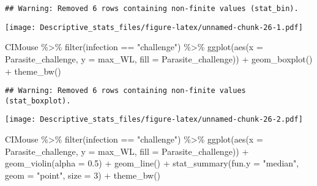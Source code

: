 \documentclass[
]{article}
\newenvironment{Shaded}{\begin{snugshade}}{\end{snugshade}}
\newcommand{\AttributeTok}[1]{\textcolor[rgb]{0.77,0.63,0.00}{#1}}
\newcommand{\DecValTok}[1]{\textcolor[rgb]{0.00,0.00,0.81}{#1}}
\newcommand{\FloatTok}[1]{\textcolor[rgb]{0.00,0.00,0.81}{#1}}
\newcommand{\FunctionTok}[1]{\textcolor[rgb]{0.00,0.00,0.00}{#1}}
\newcommand{\NormalTok}[1]{#1}
\newcommand{\SpecialCharTok}[1]{\textcolor[rgb]{0.00,0.00,0.00}{#1}}
\newcommand{\StringTok}[1]{\textcolor[rgb]{0.31,0.60,0.02}{#1}}
\begin{document}
\begin{verbatim}
## Warning: Removed 6 rows containing non-finite values (stat_bin).
\end{verbatim}

\texttt{[image: Descriptive\_stats\_files/figure-latex/unnamed-chunk-26-1.pdf]}

\begin{Shaded}
\begin{Highlighting}[]
\NormalTok{CIMouse  }\SpecialCharTok{\%\textgreater{}\%}
    \FunctionTok{filter}\NormalTok{(infection }\SpecialCharTok{==} \StringTok{"challenge"}\NormalTok{)  }\SpecialCharTok{\%\textgreater{}\%}
  \FunctionTok{ggplot}\NormalTok{(}\FunctionTok{aes}\NormalTok{(}\AttributeTok{x =}\NormalTok{ Parasite\_challenge, }\AttributeTok{y =}\NormalTok{ max\_WL, }\AttributeTok{fill =}\NormalTok{ Parasite\_challenge)) }\SpecialCharTok{+}
  \FunctionTok{geom\_boxplot}\NormalTok{() }\SpecialCharTok{+}
    \FunctionTok{theme\_bw}\NormalTok{()}
\end{Highlighting}
\end{Shaded}

\begin{verbatim}
## Warning: Removed 6 rows containing non-finite values (stat_boxplot).
\end{verbatim}

\texttt{[image: Descriptive\_stats\_files/figure-latex/unnamed-chunk-26-2.pdf]}

\begin{Shaded}
\begin{Highlighting}[]
\NormalTok{CIMouse  }\SpecialCharTok{\%\textgreater{}\%}
    \FunctionTok{filter}\NormalTok{(infection }\SpecialCharTok{==} \StringTok{"challenge"}\NormalTok{)  }\SpecialCharTok{\%\textgreater{}\%}
  \FunctionTok{ggplot}\NormalTok{(}\FunctionTok{aes}\NormalTok{(}\AttributeTok{x =}\NormalTok{ Parasite\_challenge, }\AttributeTok{y =}\NormalTok{ max\_WL, }\AttributeTok{fill =}\NormalTok{ Parasite\_challenge)) }\SpecialCharTok{+}
  \FunctionTok{geom\_violin}\NormalTok{(}\AttributeTok{alpha =} \FloatTok{0.5}\NormalTok{) }\SpecialCharTok{+}
    \FunctionTok{geom\_line}\NormalTok{() }\SpecialCharTok{+}
     \FunctionTok{stat\_summary}\NormalTok{(}\AttributeTok{fun.y =} \StringTok{"median"}\NormalTok{, }\AttributeTok{geom =} \StringTok{"point"}\NormalTok{, }\AttributeTok{size =} \DecValTok{3}\NormalTok{) }\SpecialCharTok{+}
    \FunctionTok{theme\_bw}\NormalTok{() }
\end{Highlighting}
\end{Shaded}
\end{document}

